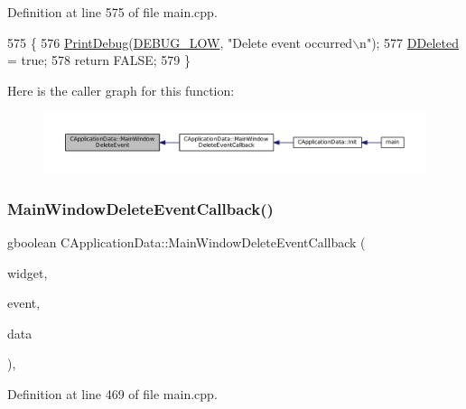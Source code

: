 Definition at line 575 of file main.\+cpp.


\begin{DoxyCode}
575                                                                                   \{
576     \hyperlink{Debug_8h_aa5f00f5537c9760f6ae1782460748ab9}{PrintDebug}(\hyperlink{Debug_8h_a3a5f3fc09784650d8388cb854882f840}{DEBUG\_LOW}, \textcolor{stringliteral}{"Delete event occurred\(\backslash\)n"});   
577     \hyperlink{classCApplicationData_a0a8651f95f3d48befd6e02a286ecdc82}{DDeleted} = \textcolor{keyword}{true};
578     \textcolor{keywordflow}{return} FALSE;    
579 \}
\end{DoxyCode}
Here is the caller graph for this function\+:\nopagebreak
\begin{figure}[H]
\begin{center}
\leavevmode
\includegraphics[width=350pt]{classCApplicationData_afd73780d7dca117edbe341cb3c908c04_icgraph}
\end{center}
\end{figure}
\hypertarget{classCApplicationData_a4b2110c03e030cf11b733955963f8854}{}\label{classCApplicationData_a4b2110c03e030cf11b733955963f8854} 
\subsubsection{\texorpdfstring{Main\+Window\+Delete\+Event\+Callback()}{MainWindowDeleteEventCallback()}}
{\footnotesize\ttfamily gboolean C\+Application\+Data\+::\+Main\+Window\+Delete\+Event\+Callback (\begin{DoxyParamCaption}\item[{Gtk\+Widget $\ast$}]{widget,  }\item[{Gdk\+Event $\ast$}]{event,  }\item[{gpointer}]{data }\end{DoxyParamCaption})\hspace{0.3cm}{\ttfamily [static]}, {\ttfamily [protected]}}



Definition at line 469 of file main.\+cpp.


